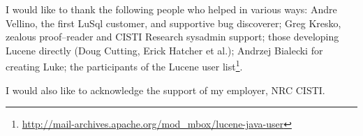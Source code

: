 
I would like to thank the following people who helped in various ways:
 Andre Vellino, the first LuSql customer, and supportive bug discoverer;
 Greg Kresko, zealous proof--reader and CISTI Research sysadmin support;
 those developing Lucene directly (Doug Cutting, Erick Hatcher et al.);
 Andrzej Bialecki for creating Luke;
 the participants of the Lucene user list\footnote{\url{http://mail-archives.apache.org/mod_mbox/lucene-java-user}}. 


\noindent I would also like to acknowledge the support of my employer, NRC CISTI.
